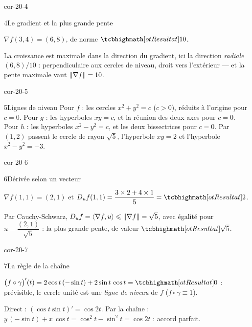 \begin{blocLivre}{cor-20-4}
\begin{corrige}{4}{Le gradient et la plus grande pente}
\begin{questions}
  \item $\nabla f(3,4)=(6,8)$, de norme $\res{10}$.
  \item La croissance est maximale dans la direction du gradient, ici la
    direction \emph{radiale} $(6,8)/10$ : perpendiculaire aux cercles de
    niveau, droit vers l'extérieur — et la pente maximale vaut
    $\left\lVert\nabla f\right\rVert=10$.
\end{questions}
\end{corrige}
\end{blocLivre}

\begin{blocLivre}{cor-20-5}
\begin{corrige}{5}{Lignes de niveau}
Pour $f$ : les cercles $x^{2}+y^{2}=c$ ($c>0$), réduits à l'origine pour
$c=0$. Pour $g$ : les hyperboles $xy=c$, et la réunion des deux axes pour
$c=0$. Pour $h$ : les hyperboles $x^{2}-y^{2}=c$, et les deux
bissectrices pour $c=0$. Par $(1,2)$ passent le cercle de rayon
$\sqrt5$, l'hyperbole $xy=2$ et l'hyperbole $x^{2}-y^{2}=-3$.
\end{corrige}
\end{blocLivre}

\begin{blocLivre}{cor-20-6}
\begin{corrige}{6}{Dérivée selon un vecteur}
\begin{questions}
  \item $\nabla f(1,1)=(2,1)$ et
    $D_uf(1,1)=\dfrac{3\times2+4\times1}{5}=\res{2}$.
  \item Par Cauchy-Schwarz,
    $D_uf=\langle\nabla f,u\rangle\leqslant\left\lVert\nabla f\right\rVert=\sqrt5$,
    avec égalité pour $u=\dfrac{(2,1)}{\sqrt5}$ : la plus grande pente,
    de valeur $\res{\sqrt5}$.
\end{questions}
\end{corrige}
\end{blocLivre}

\begin{blocLivre}{cor-20-7}
\begin{corrige}{7}{La règle de la chaîne}
\begin{questions}
  \item $\bigl(f\circ\gamma\bigr)'(t)
    =2\cos t\,(-\sin t)+2\sin t\,\cos t=\res{0}$ : prévisible, le cercle
    unité est une \emph{ligne de niveau} de $f$ ($f\circ\gamma\equiv1$).
  \item Direct : $(\cos t\sin t)'=\cos2t$. Par la chaîne :
    $y\,(-\sin t)+x\,\cos t=\cos^{2}t-\sin^{2}t=\cos2t$ : accord
    parfait.
\end{questions}
\end{corrige}
\end{blocLivre}

